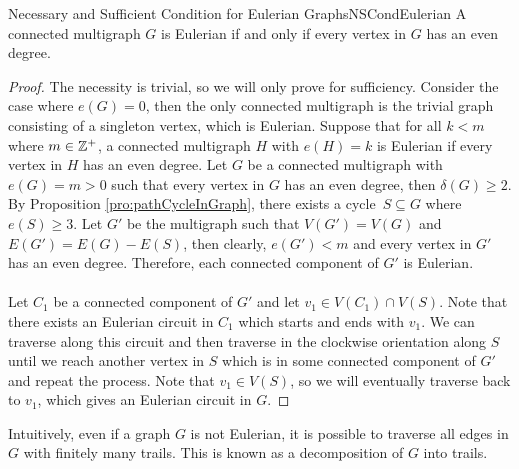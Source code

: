 \documentclass[math]{amznotes}
\theoremstyle{remark}
\begin{document}
\begin{thmbox}{Necessary and Sufficient Condition for Eulerian Graphs}{NSCondEulerian}
    A connected multigraph $G$ is Eulerian if and only if every vertex in $G$ has an even degree.
    \tcblower
    \begin{proof}
        The necessity is trivial, so we will only prove for sufficiency. Consider the case where $e(G) = 0$, then the only connected multigraph is the trivial graph consisting of a singleton vertex, which is Eulerian. Suppose that for all $k < m$ where $m \in \mathbb{Z}^+$, a connected multigraph $H$ with $e(H) = k$ is Eulerian if every vertex in $H$ has an even degree. Let $G$ be a connected multigraph with $e(G) = m > 0$ such that every vertex in $G$ has an even degree, then $\delta(G) \geq 2$. By Proposition \ref{pro:pathCycleInGraph}, there exists a cycle~$S \subseteq G$ where $e(S) \geq 3$. Let $G'$ be the multigraph such that $V(G') = V(G)$ and~$E(G') = E(G) - E(S)$, then clearly, $e(G') < m$ and every vertex in $G'$ has an even degree. Therefore, each connected component of $G'$ is Eulerian.
        \\\\
        Let $C_1$ be a connected component of $G'$ and let $v_1 \in V(C_1) \cap V(S)$. Note that there exists an Eulerian circuit in $C_1$ which starts and ends with $v_1$. We can traverse along this circuit and then traverse in the clockwise orientation along $S$ until we reach another vertex in $S$ which is in some connected component of $G'$ and repeat the process. Note that $v_1 \in V(S)$, so we will eventually traverse back to $v_1$, which gives an Eulerian circuit in $G$.
    \end{proof}
\end{thmbox}
Intuitively, even if a graph $G$ is not Eulerian, it is possible to traverse all edges in $G$ with finitely many trails. This is known as a decomposition of $G$ into trails.
\end{document}
